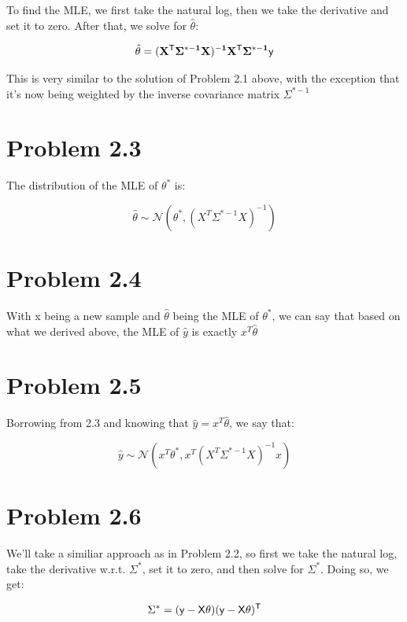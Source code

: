 \documentclass{article}
\begin{document}
To find the MLE, we first take the natural log, then we take the derivative and set it to zero. After that, we solve for $\hat{\theta}$:

\begin{align*}
  \hat{\theta} = (\bf{X}^{\sf{T}}\Sigma^{*-1}\bf{X})^{-1}\bf{X}^{\sf{T}}\Sigma^{*-1}\bf{\sf{y}}
\end{align*}

This is very similar to the solution of Problem 2.1 above, with the exception that it's now being weighted by the inverse covariance matrix $\Sigma^{*-1}$

\section*{Problem 2.3}

The distribution of the MLE of $\theta^*$ is:

\[\hat{\theta} \sim \mathcal{N}(\theta^*, (X^T\Sigma^{*-1}X)^{-1})\]

\section*{Problem 2.4}

With x being a new sample and $\hat{\theta}$ being the MLE of $\theta^*$, we can say that based on what we derived above, the MLE of $\hat{y}$ is exactly $x^T\hat{\theta}$

\section*{Problem 2.5}

Borrowing from 2.3 and knowing that $\hat{y} = x^T\hat{\theta}$, we say that:

\[\hat{y} \sim \mathcal{N}(x^T\theta^*, x^T (X^T\Sigma^{*-1}X)^{-1}x)\]

\section*{Problem 2.6}

We'll take a similiar approach as in Problem 2.2, so first we take the natural log, take the derivative w.r.t. $\Sigma^*$, set it to zero, and then solve for $\Sigma^*$. Doing so, we get:

\[\Sigma^* = (\sf{y}-X\theta)(\sf{y}-X\theta)^T\]
\end{document}
